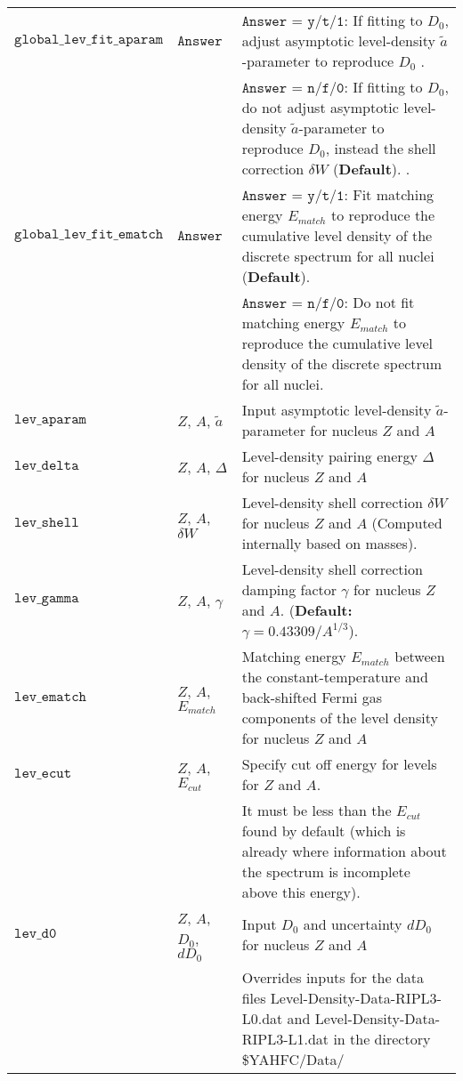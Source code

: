 \documentclass[
10pt,
showpacs,preprintnumbers,footinbib,
amsfonts,amsmath,amssymb,
aps,
prc,twocolumn,groupedaddress,superscriptaddress,
showkeys,
nofootinbib
]{revtex4-1}
\begin{document}
\begin{center}
\begin{tabular}{| p{4cm} | p{4 cm} | p{9 cm} |}
\hline
${\texttt{global\_lev\_fit\_aparam}}$  & ${\texttt{Answer}}$ & ${\texttt{Answer}}$ = ${\texttt{y/t/1}}$: If fitting to $D_0$, adjust asymptotic level-density $\tilde a$-parameter to reproduce $D_0$ . \\
& & ${\texttt{Answer}}$ = ${\texttt{n/f/0}}$: If fitting to $D_0$, do not adjust asymptotic level-density $\tilde a$-parameter to reproduce $D_0$, instead the shell correction $\delta W$ ({\bf Default}). . \\
\hline
${\texttt{global\_lev\_fit\_ematch}}$  & ${\texttt{Answer}}$ & ${\texttt{Answer}}$ = ${\texttt{y/t/1}}$: Fit matching energy $E_{match}$ to reproduce the cumulative level density of the discrete spectrum for all nuclei ({\bf Default}). \\
& & ${\texttt{Answer}}$ = ${\texttt{n/f/0}}$: Do not fit matching energy $E_{match}$ to reproduce the cumulative level density of the discrete spectrum for all nuclei. \\
\hline
${\texttt{lev\_aparam}}$ &  $Z$, $A$,  $\tilde a$ &     Input asymptotic level-density $\tilde a$-parameter for nucleus $Z$ and $A$\\
\hline
${\texttt{lev\_delta}}$ &  $Z$, $A$,  $\Delta $ &     Level-density pairing energy $\Delta$ for nucleus $Z$ and $A$\\
\hline
${\texttt{lev\_shell}}$ &  $Z$, $A$,  $\delta W$ &  Level-density shell correction $\delta W$ for nucleus $Z$ and $A$ (Computed internally based on masses).\\
\hline
${\texttt{lev\_gamma}}$ &  $Z$, $A$,  $\gamma$ &     Level-density shell correction damping factor $\gamma$ for nucleus $Z$ and $A$. ({\bf Default:} $\gamma = 0.43309/A^{1/3}$).\\
\hline
${\texttt{lev\_ematch}}$ &  $Z$, $A$,  $E_{match}$ &   Matching energy $E_{match}$ between the constant-temperature and back-shifted Fermi gas components of the level density for nucleus $Z$ and $A$\\
\hline
${\texttt{lev\_ecut}}$ &  $Z$, $A$,  $E_{cut}$ &     Specify cut off energy for levels for $Z$ and $A$.\\
& & It must be less than the $E_{cut}$ found by default (which is
    already where information about the spectrum is incomplete 
    above this energy).\\
\hline
${\texttt{lev\_d0}}$ &  $Z$, $A$,  $D_0$, $dD_0$  &  Input $D_0$ and uncertainty $dD_0$ for nucleus $Z$ and $A$\\
& & Overrides inputs for the data files Level-Density-Data-RIPL3-L0.dat and Level-Density-Data-RIPL3-L1.dat in the directory \$YAHFC/Data/ \\

\end{tabular}
\end{center}
\end{document}
